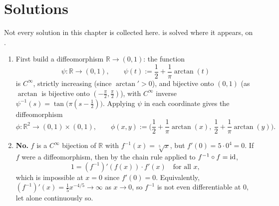 
\section{Solutions}
\label{sec:ift_solutions}

Not every solution in this chapter is collected here.  is solved
where it appears, on .

\begin{exercisesolution}
\label{sol:diffeomorphism_properties}
\begin{enumerate}[label=\textbf{(\alph*)}]
  \item First build a diffeomorphism $\mathbb{R} \to (0,1)$: the function
    \[\psi : \mathbb{R} \to (0,1), \qquad \psi(t) := \frac12+\frac1\pi\arctan(t)\]
    is $C^\infty$, strictly increasing (since $\arctan' > 0$), and bijective onto $(0,1)$ (as
    $\arctan$ is bijective onto $(-\tfrac\pi2,\tfrac\pi2)$), with $C^\infty$ inverse
    $\psi^{-1}(s) = \tan\big(\pi(s-\tfrac12)\big)$. Applying $\psi$ in each coordinate gives the
    diffeomorphism
    \[\phi : \mathbb{R}^2 \to (0,1)\times(0,1), \qquad \phi(x,y) := \Big(\frac12+\frac1\pi\arctan(x),\ \frac12+\frac1\pi\arctan(y)\Big).\]
  \item \textbf{No.} $f$ is a $C^\infty$ bijection of $\mathbb{R}$ with $f^{-1}(x) =
    \sqrt[5]{x}$, but $f'(0) = 5\cdot0^4 = 0$. If $f$ were a diffeomorphism, then by the
    chain rule applied to $f^{-1}\circ f = \operatorname{id}$,
    \[1 = (f^{-1})'(f(x))\cdot f'(x) \quad \text{for all } x,\]
    which is impossible at $x=0$ since $f'(0)=0$. Equivalently, $(f^{-1})'(x) =
    \tfrac15x^{-4/5} \to \infty$ as $x \to 0$, so $f^{-1}$ is not even differentiable at $0$,
    let alone continuously so.
\end{enumerate}
\end{exercisesolution}

